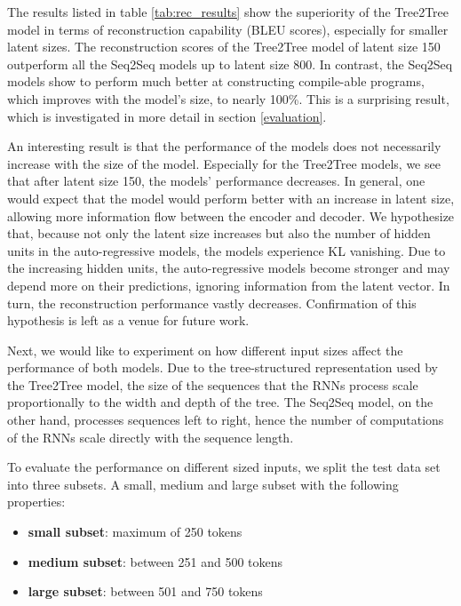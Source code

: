 The results listed in table \ref{tab:rec_results} show the superiority of the Tree2Tree model in terms of reconstruction capability (BLEU scores), especially for smaller latent sizes. The reconstruction scores of the Tree2Tree model of latent size 150 outperform all the Seq2Seq models up to latent size 800. In contrast, the Seq2Seq models show to perform much better at constructing compile-able programs, which improves with the model's size, to nearly 100\%. This is a surprising result, which is investigated in more detail in section \ref{evaluation}.

 


An interesting result is that the performance of the models does not necessarily increase with the size of the model. Especially for the Tree2Tree models, we see that after latent size 150, the models' performance decreases. In general, one would expect that the model would perform better with an increase in latent size, allowing more information flow between the encoder and decoder. We hypothesize that, because not only the latent size increases but also the number of hidden units in the auto-regressive models, the models experience KL vanishing. Due to the increasing hidden units, the auto-regressive models become stronger and may depend more on their predictions, ignoring information from the latent vector. In turn, the reconstruction performance vastly decreases. Confirmation of this hypothesis is left as a venue for future work.



Next, we would like to experiment on how different input sizes affect the performance of both models. Due to the tree-structured representation used by the Tree2Tree model, the size of the sequences that the RNNs process scale proportionally to the width and depth of the tree. The Seq2Seq model, on the other hand, processes sequences left to right, hence the number of computations of the RNNs scale directly with the sequence length. 



To evaluate the performance on different sized inputs, we split the test data set into three subsets. A small, medium and large subset with the following properties:

\begin{itemize}
    \item \textbf{small subset}: maximum of 250 tokens
    \item \textbf{medium subset}: between 251 and 500 tokens
    \item \textbf{large subset}: between 501 and 750 tokens
\end{itemize}

